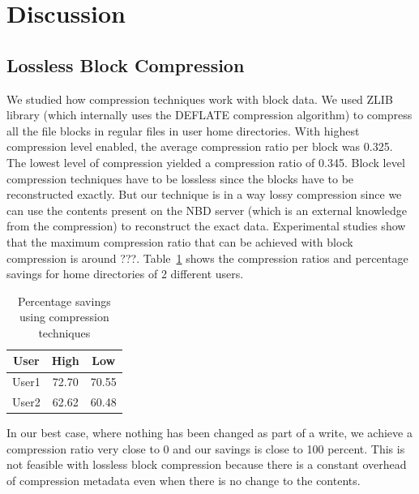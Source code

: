 \documentclass[10pt,twocolumn]{article}
\begin{document}
\section{Discussion}
\label{sec:discussion}

\subsection {Lossless Block Compression}
We studied how compression techniques work with block data. %
We used ZLIB library \cite{gailly04} (which internally uses the DEFLATE
compression algorithm) to compress all the file blocks in regular files in user
home directories. %
With highest compression level enabled, the average compression ratio per block
was 0.325. %
The lowest level of compression yielded a compression ratio of 0.345. %
Block level compression techniques have to be lossless since the blocks have to be
reconstructed exactly. %
But our technique is in a way lossy compression since we can use the contents
present on the NBD server (which is an external knowledge from the compression)
to reconstruct the exact data. %
Experimental studies show that the maximum compression ratio that can be
achieved with block compression is around ???. %
Table~\ref{table:comptechniques} shows the compression ratios and percentage
savings for home directories of 2 different users. %


\begin{table}[ht]
  \centering 
  \begin{tabular}{|c|c|c|} %
    \hline
    User & High & Low \\ \hline
    User1 & 72.70 & 70.55  \\
    User2 & 62.62 & 60.48  \\ \hline
  \end{tabular}
  \caption{Percentage savings using compression techniques} 
  \label{table:comptechniques} 
\end{table}

In our best case, where nothing has been changed as part of a write, we achieve
a compression ratio very close to 0 and our savings is close to 100 percent.
This is not feasible with lossless block compression because there is a
constant overhead of compression metadata even when there is no change to the
contents.
\end{document}
